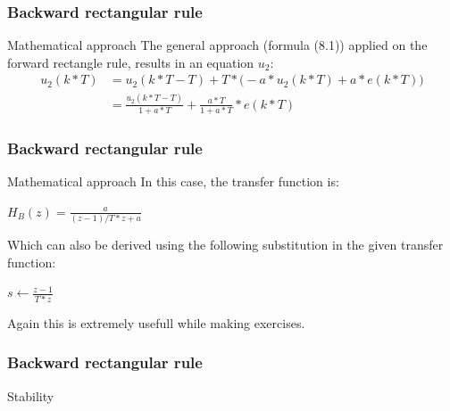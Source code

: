 \begin{frame}
	\frametitle{Backward rectangular rule}	
	\begin{block}{Mathematical approach}
		The general approach (formula (8.1)) applied on the forward rectangle rule, results in an equation $u_2$:
		\begin{align*}
		u_2(k*T)& =u_2(k*T - T) + T*\big(-a*u_2(k*T) + a*e(k*T) \big)\\
		& =\frac{u_2(k*T - T)}{1 + a*T} + \frac{a*T}{1 + a*T}*e(k*T)
		\end{align*}
	\end{block}
\end{frame}

\begin{frame}
	\frametitle{Backward rectangular rule}
	\begin{block}{Mathematical approach}
		In this case, the transfer function is:
		\begin{center}
			$H_B(z) = \frac{a}{(z-1)/T*z+a}$
		\end{center}
		Which can also be derived using the following substitution in the given transfer function:
		\begin{center}
			$s \gets \frac{z-1}{T*z}$
		\end{center}
		Again this is extremely usefull while making exercises.
	\end{block}
\end{frame}

\begin{frame}
	\frametitle{Backward rectangular rule}
	\begin{block}{Stability}
	\end{block}
\end{frame}	

